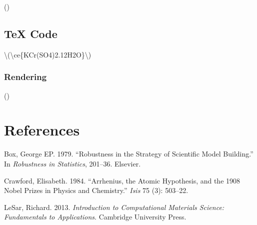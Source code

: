 \documentclass{book}
\newlength{\cslhangindent}
\newlength{\cslentryspacingunit} %
\newenvironment{CSLReferences}[2] %
 {%
  \setlength{\parindent}{0pt}
  \ifodd #1
  \let\oldpar\par
  \def\par{\hangindent=\cslhangindent\oldpar}
  \fi
  \setlength{\parskip}{#2\cslentryspacingunit}
 }%
 {}
\newenvironment{Shaded}{}{}
\newcommand{\SpecialCharTok}[1]{\textcolor[rgb]{0.25,0.44,0.63}{#1}}
\newcommand{\SpecialStringTok}[1]{\textcolor[rgb]{0.73,0.40,0.53}{#1}}
\begin{document}
()

\hypertarget{tex-code-4}{%
\section{TeX Code}\label{tex-code-4}}

\begin{Shaded}
\begin{Highlighting}[]
\SpecialStringTok{\textbackslash{}(}\SpecialCharTok{\textbackslash{}ce}\SpecialStringTok{\{KCr(SO4)2.12H2O\}\textbackslash{})}
\end{Highlighting}
\end{Shaded}

\hypertarget{rendering-4}{%
\subsection{Rendering}\label{rendering-4}}

()

\hypertarget{bibliography}{%
\chapter*{References}\label{bibliography}}

\hypertarget{refs}{}
\begin{CSLReferences}{1}{0}
\leavevmode{}%
Box, George EP. 1979. {``Robustness in the Strategy of Scientific Model
Building.''} In \emph{Robustness in Statistics}, 201--36. Elsevier.

\leavevmode{}%
Crawford, Elisabeth. 1984. {``Arrhenius, the Atomic Hypothesis, and the 1908
Nobel Prizes in Physics and Chemistry.''} \emph{Isis} 75 (3): 503--22.

\leavevmode{}%
LeSar, Richard. 2013. \emph{Introduction to Computational Materials Science:
Fundamentals to Applications}. Cambridge University Press.

\end{CSLReferences}

\backmatter
\end{document}
